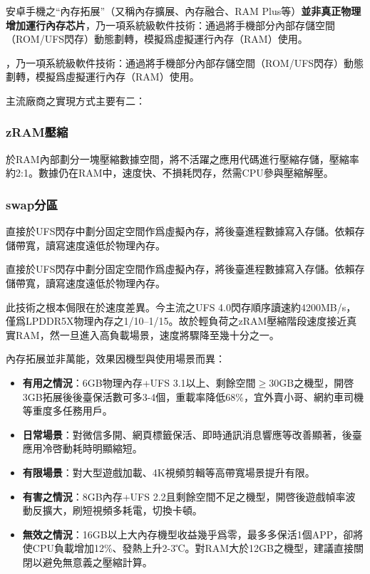 


安卓手機之“內存拓展”（又稱內存擴展、內存融合、RAM Plus等）\textbf{並非真正物理增加運行內存芯片}，乃一項系統級軟件技術：通過將手機部分內部存儲空間（ROM/UFS閃存）動態劃轉，模擬爲虛擬運行內存（RAM）使用。

，乃一項系統級軟件技術：通過將手機部分內部存儲空間（ROM/UFS閃存）動態劃轉，模擬爲虛擬運行內存（RAM）使用。


主流廠商之實現方式主要有二：

\subsubsection*{zRAM壓縮}

於RAM內部劃分一塊壓縮數據空間，將不活躍之應用代碼進行壓縮存儲，壓縮率約2:1。數據仍在RAM中，速度快、不損耗閃存，然需CPU參與壓縮解壓。

\subsubsection*{swap分區}

直接於UFS閃存中劃分固定空間作爲虛擬內存，將後臺進程數據寫入存儲。依賴存儲帶寬，讀寫速度遠低於物理內存。

直接於UFS閃存中劃分固定空間作爲虛擬內存，將後臺進程數據寫入存儲。依賴存儲帶寬，讀寫速度遠低於物理內存。


此技術之根本侷限在於速度差異。今主流之UFS 4.0閃存順序讀速約4200MB/s，僅爲LPDDR5X物理內存之1/10–1/15。故於輕負荷之zRAM壓縮階段速度接近真實RAM，然一旦進入高負載場景，速度將驟降至幾十分之一。


內存拓展並非萬能，效果因機型與使用場景而異：

\begin{itemize}
  \item \textbf{有用之情況}：6GB物理內存+UFS 3.1以上、剩餘空間$\geq$30GB之機型，開啓3GB拓展後後臺保活數可多3-4個，重載率降低68\%，宜外賣小哥、網約車司機等重度多任務用戶。
  \item \textbf{日常場景}：對微信多開、網頁標籤保活、即時通訊消息響應等改善顯著，後臺應用冷啓動耗時明顯縮短。
  \item \textbf{有限場景}：對大型遊戲加載、4K視頻剪輯等高帶寬場景提升有限。
  \item \textbf{有害之情況}：8GB內存+UFS 2.2且剩餘空間不足之機型，開啓後遊戲幀率波動反擴大，刷短視頻多耗電，切換卡頓。
  \item \textbf{無效之情況}：16GB以上大內存機型收益幾乎爲零，最多多保活1個APP，卻將使CPU負載增加12\%、發熱上升2-3℃。對RAM大於12GB之機型，建議直接關閉以避免無意義之壓縮計算。
\end{itemize}

